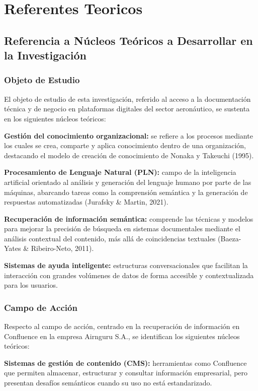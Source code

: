 \chapter{Referentes Teoricos}
\section{Referencia a Núcleos Teóricos a Desarrollar en la Investigación}
\subsection{Objeto de Estudio}
El objeto de estudio de esta investigación, referido al acceso a la documentación técnica y de negocio en plataformas digitales del sector aeronáutico, se sustenta en los siguientes núcleos teóricos:

\textbf{Gestión del conocimiento organizacional:} se refiere a los procesos mediante los cuales se crea, comparte y aplica conocimiento dentro de una organización, destacando el modelo de creación de conocimiento de Nonaka y Takeuchi (1995).
  
\textbf{Procesamiento de Lenguaje Natural (PLN):} campo de la inteligencia artificial orientado al análisis y generación del lenguaje humano por parte de las máquinas, abarcando tareas como la comprensión semántica y la generación de respuestas automatizadas (Jurafsky \& Martin, 2021).
  
\textbf{Recuperación de información semántica:} comprende las técnicas y modelos para mejorar la precisión de búsqueda en sistemas documentales mediante el análisis contextual del contenido, más allá de coincidencias textuales (Baeza-Yates \& Ribeiro-Neto, 2011).
  
\textbf{Sistemas de ayuda inteligente:} estructuras conversacionales que facilitan la interacción con grandes volúmenes de datos de forma accesible y contextualizada para los usuarios.


\subsection{Campo de Acción}
Respecto al campo de acción, centrado en la recuperación de información en Confluence en la empresa Airnguru S.A., se identifican los siguientes núcleos teóricos:

\textbf{Sistemas de gestión de contenido (CMS):} herramientas como Confluence que permiten almacenar, estructurar y consultar información empresarial, pero presentan desafíos semánticos cuando su uso no está estandarizado.

